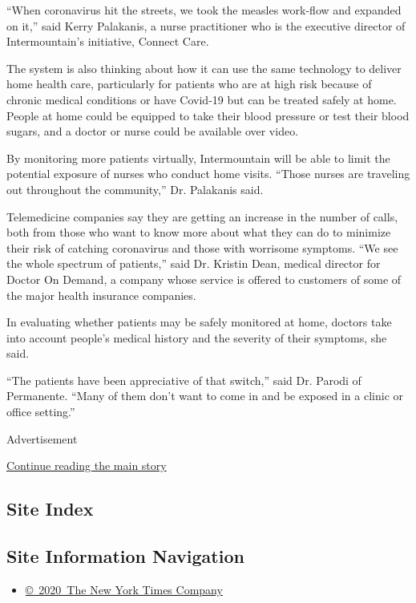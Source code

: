 ``When coronavirus hit the streets, we took the measles work-flow and
expanded on it,'' said Kerry Palakanis, a nurse practitioner who is the
executive director of Intermountain's initiative, Connect Care.

The system is also thinking about how it can use the same technology to
deliver home health care, particularly for patients who are at high risk
because of chronic medical conditions or have Covid-19 but can be
treated safely at home. People at home could be equipped to take their
blood pressure or test their blood sugars, and a doctor or nurse could
be available over video.

By monitoring more patients virtually, Intermountain will be able to
limit the potential exposure of nurses who conduct home visits. ``Those
nurses are traveling out throughout the community,'' Dr. Palakanis said.

Telemedicine companies say they are getting an increase in the number of
calls, both from those who want to know more about what they can do to
minimize their risk of catching coronavirus and those with worrisome
symptoms. ``We see the whole spectrum of patients,'' said Dr. Kristin
Dean, medical director for Doctor On Demand, a company whose service is
offered to customers of some of the major health insurance companies.

In evaluating whether patients may be safely monitored at home, doctors
take into account people's medical history and the severity of their
symptoms, she said.

``The patients have been appreciative of that switch,'' said Dr. Parodi
of Permanente. ``Many of them don't want to come in and be exposed in a
clinic or office setting.''

Advertisement

\protect\hyperlink{after-bottom}{Continue reading the main story}

\hypertarget{site-index}{%
\subsection{Site Index}\label{site-index}}

\hypertarget{site-information-navigation}{%
\subsection{Site Information
Navigation}\label{site-information-navigation}}

\begin{itemize}
\tightlist
\item
  \href{https://help.nytimes.com/hc/en-us/articles/115014792127-Copyright-notice}{©~2020~The
  New York Times Company}
\end{itemize}

